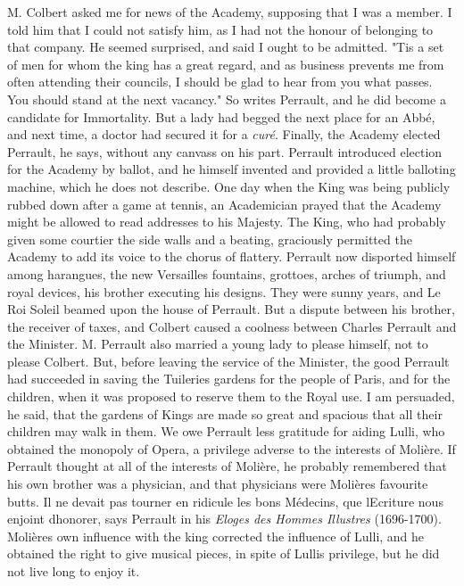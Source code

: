 \documentclass[14pt,a4paper]{memoir}
\begin{document}
\textquotesingle M. Colbert asked me for news of the Academy, supposing
that I was a member. I told him that I could not satisfy him, as I had
not the honour of belonging to that company. He seemed surprised, and
said I ought to be admitted. "\textquotesingle Tis a set of men for whom
the king has a great regard, and as business prevents me from often
attending their councils, I should be glad to hear from you what passes.
You should stand at the next vacancy."\textquotesingle{} So writes
Perrault, and he did become a candidate for Immortality. But a lady had
begged the next place for an Abbé, and next time, a doctor had secured
it for a \emph{curé}. Finally, the Academy elected Perrault, he says,
without any canvass on his part. Perrault introduced election for the
Academy by ballot, and he himself invented and provided a little
balloting machine, which he does not describe. One day when the King was
being publicly rubbed down after a game at tennis, an Academician prayed
that the Academy might be allowed to read addresses to his Majesty. The
King, who had probably given some courtier the side walls and a beating,
graciously permitted the Academy to add its voice to the chorus of
flattery. Perrault now disported himself among harangues, the new
Versailles fountains, grottoes, arches of triumph, and royal devices,
his brother executing his designs. They were sunny years, and Le Roi
Soleil beamed upon the house of Perrault. But a dispute between his
brother, the receiver of taxes, and Colbert caused a coolness between
Charles Perrault and the Minister. M. Perrault also married a young lady
to please himself, not to please Colbert. But, before leaving the
service of the Minister, the good Perrault had succeeded in saving the
Tuileries gardens for the people of Paris, and for the children, when it
was proposed to reserve them to the Royal use. \textquotesingle I am
persuaded,\textquotesingle{} he said, \textquotesingle that the gardens
of Kings are made so great and spacious that all their children may walk
in them.\textquotesingle{} We owe Perrault less gratitude for aiding
Lulli, who obtained the monopoly of Opera, a privilege adverse to the
interests of Molière. If Perrault thought at all of the interests of
Molière, he probably remembered that his own brother was a physician,
and that physicians were Molière\textquotesingle s favourite butts.
\textquotesingle Il ne devait pas tourner en ridicule les bons Médecins,
que l\textquotesingle Ecriture nous enjoint
d\textquotesingle honorer,\textquotesingle{} says Perrault in his
\emph{Eloges des Hommes Illustres} (1696-1700).
Molière\textquotesingle s own influence with the king corrected the
influence of Lulli, and he obtained the right to give musical pieces, in
spite of Lulli\textquotesingle s privilege, but he did not live long to
enjoy
it.
\end{document}
